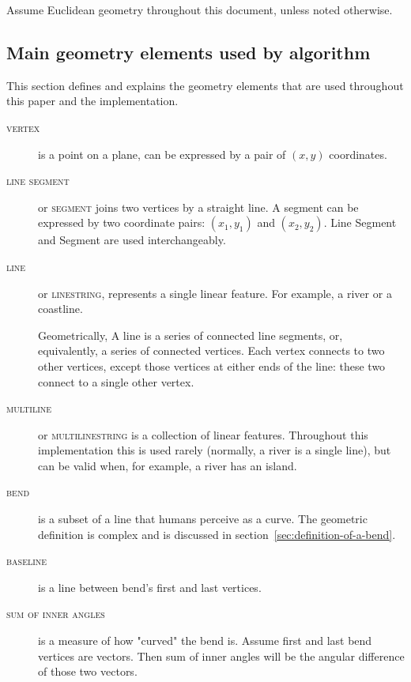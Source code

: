 \documentclass[a4paper]{article}
\begin{document}
Assume Euclidean geometry throughout this document, unless noted otherwise.

\subsection{Main geometry elements used by algorithm}
\label{sec:vocab}

This section defines and explains the geometry elements that are used
throughout this paper and the implementation.

\begin{description}

    \item[\normalfont\textsc{vertex}] is a point on a plane, can be expressed
        by a pair of $(x,y)$ coordinates.

    \item[\normalfont\textsc{line segment}] or \textsc{segment} joins two
        vertices by a straight line. A segment can be expressed by two
        coordinate pairs: $(x_1, y_1)$ and $(x_2, y_2)$. Line Segment and
        Segment are used interchangeably.

    \item[\normalfont\textsc{line}] or \textsc{linestring}, represents a single
        linear feature. For example, a river or a coastline.

        Geometrically, A line is a series of connected line segments, or,
        equivalently, a series of connected vertices. Each vertex connects to
        two other vertices, except those vertices at either ends of the line:
        these two connect to a single other vertex.

    \item[\normalfont\textsc{multiline}] or \textsc{multilinestring} is a
        collection of linear features. Throughout this implementation this is
        used rarely (normally, a river is a single line), but can be valid
        when, for example, a river has an island.

    \item[\normalfont\textsc{bend}] is a subset of a line that humans perceive
        as a curve. The geometric definition is complex and is discussed in
        section~\ref{sec:definition-of-a-bend}.

    \item[\normalfont\textsc{baseline}] is a line between bend's first and last
        vertices.

    \item[\normalfont\textsc{sum of inner angles}] is a measure of how "curved"
        the bend is. Assume first and last bend vertices are vectors. Then sum
        of inner angles will be the angular difference of those two vectors.


\end{description}
\end{document}
